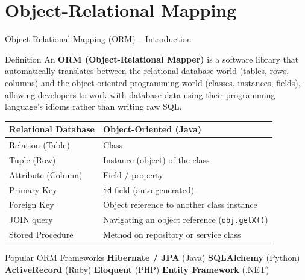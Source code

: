 \section{Object-Relational Mapping}

\begin{frame}{Object-Relational Mapping (ORM) -- Introduction}
  \begin{block}{Definition}
    An \textbf{ORM (Object-Relational Mapper)} is a software library that automatically translates
    between the relational database world (tables, rows, columns) and the object-oriented programming
    world (classes, instances, fields), allowing developers to work with database data using their
    programming language's idioms rather than writing raw SQL.
  \end{block}

  \begin{center}
  \renewcommand{\arraystretch}{1.25}
  \begin{tabular}{@{}ll@{}}
    \toprule
    \textbf{Relational Database} & \textbf{Object-Oriented (Java)} \\
    \midrule
    Relation (Table)      & Class \\
    Tuple (Row)           & Instance (object) of the class \\
    Attribute (Column)    & Field / property \\
    Primary Key           & \texttt{id} field (auto-generated) \\
    Foreign Key           & Object reference to another class instance \\
    JOIN query            & Navigating an object reference (\texttt{obj.getX()}) \\
    Stored Procedure      & Method on repository or service class \\
    \bottomrule
  \end{tabular}
  \end{center}

  \begin{exampleblock}{Popular ORM Frameworks}
    \textbf{Hibernate / JPA} (Java) \quad \textbf{SQLAlchemy} (Python) \quad
    \textbf{ActiveRecord} (Ruby) \quad \textbf{Eloquent} (PHP) \quad
    \textbf{Entity Framework} (.NET)
  \end{exampleblock}
\end{frame}

